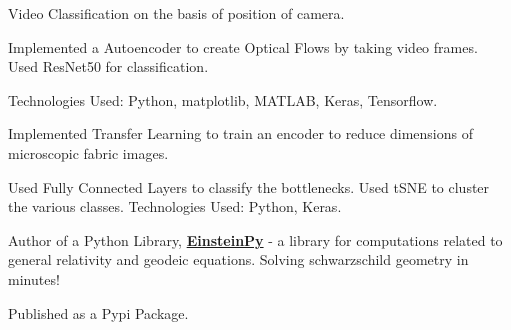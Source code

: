 \documentclass[a4paper]{deedy-resume-openfont}
\begin{document}
\begin{minipage}[t]{0.66\textwidth}
\begin{tightemize}
\item Video Classification on the basis of position of camera. \item Implemented a Autoencoder to create Optical Flows by taking video frames. Used ResNet50 for classification.
\item Technologies Used: Python, matplotlib, MATLAB, Keras, Tensorflow.
\end{tightemize}
\sectionsep

\begin{tightemize}
\item Implemented Transfer Learning to train an encoder to reduce dimensions of microscopic fabric images. \item Used Fully Connected Layers to classify the bottlenecks. Used tSNE to cluster the various classes. Technologies Used: Python, Keras.
\end{tightemize}
\sectionsep



\begin{tightemize}
\item Author of a Python Library, \textbf{\href{http://github.com/einsteinpy/einsteinpy}{EinsteinPy}} - a library for computations related to general relativity and geodeic equations. Solving schwarzschild geometry in minutes! 
\item Published as a Pypi Package.
\end{tightemize}
\sectionsep










\end{minipage}
\end{document}

